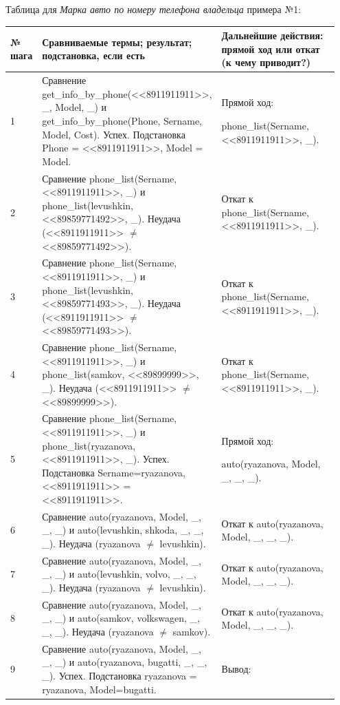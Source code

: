 \documentclass[a4paper,12pt]{article}
\begin{document}
	\newpage
	
	Таблица для \textit{Марка авто по номеру телефона владельца} примера №1:
	
	\begin{table} [h!]
		\begin{center}
			\begin{tabular}{|p{0.05\linewidth}|p{0.5\linewidth}|p{0.4\linewidth}|}
				\hline
				{\bf  № шага} & {\bf Сравниваемые термы; результат; подстановка, если есть} & {\bf Дальнейшие действия: прямой ход или откат (к чему приводит?)} \\
				\hline
				{1} & {Сравнение get\_info\_by\_phone(<<8911911911>>, \_, Model, \_) и get\_info\_by\_phone(Phone, Sername, Model, Cost). Успех. Подстановка Phone = <<8911911911>>, Model = Model.} & {Прямой ход: 
					
					phone\_list(Sername, <<8911911911>>, \_).}\\
				\hline
				{2} & {Сравнение phone\_list(Sername, <<8911911911>>, \_) и phone\_list(levushkin, <<89859771492>>, \_). Неудача (<<8911911911>> $\neq$ <<89859771492>>).} & {Откат к phone\_list(Sername, <<8911911911>>, \_).}\\
				\hline
				{3} & {Сравнение phone\_list(Sername, <<8911911911>>, \_) и phone\_list(levushkin, <<89859771493>>, \_). Неудача (<<8911911911>> $\neq$ <<89859771493>>).} & {Откат к phone\_list(Sername, <<8911911911>>, \_).}\\
				\hline
				{4} & {Сравнение phone\_list(Sername, <<8911911911>>, \_) и phone\_list(samkov, <<89899999>>, \_). Неудача (<<8911911911>> $\neq$ <<89899999>>).} & {Откат к phone\_list(Sername, <<8911911911>>, \_).}\\
				\hline
				{5} & {Сравнение phone\_list(Sername, <<8911911911>>, \_) и phone\_list(ryazanova, <<8911911911>>, \_). Успех. Подстановка Sername=ryazanova, <<8911911911>> = <<8911911911>>.} & {Прямой ход: 
					
					auto(ryazanova, Model, \_, \_, \_).}\\
				\hline
				{6} & {Сравнение auto(ryazanova, Model, \_, \_, \_) и auto(levushkin, shkoda, \_, \_, \_). Неудача (ryazanova $\neq$ levushkin).} & {Откат к auto(ryazanova, Model, \_, \_, \_).}\\
				\hline
				{7} & {Сравнение auto(ryazanova, Model, \_, \_, \_) и auto(levushkin, volvo, \_, \_, \_). Неудача (ryazanova $\neq$ levushkin).} & {Откат к auto(ryazanova, Model, \_, \_, \_).}\\
				\hline
				{8} & {Сравнение auto(ryazanova, Model, \_, \_, \_) и auto(samkov, volkswagen, \_, \_, \_). Неудача (ryazanova $\neq$ samkov).} & {Откат к auto(ryazanova, Model, \_, \_, \_).}\\
				\hline
				{9} & {Сравнение auto(ryazanova, Model, \_, \_, \_) и auto(ryazanova, bugatti, \_, \_, \_). Успех. Подстановка ryazanova = ryazanova, Model=bugatti.} & {Вывод: 
					
}
\end{tabular}
\end{center}
\end{table}
\end{document}
